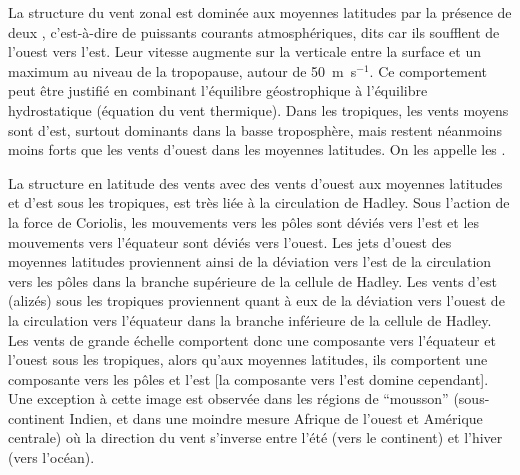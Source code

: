 \sk
La structure du vent zonal est dominée aux moyennes latitudes par la présence de deux , c'est-à-dire de puissants courants atmosphériques, dits  car ils soufflent de l'ouest vers l'est. Leur vitesse augmente sur la verticale entre la surface et un maximum au niveau de la tropopause, autour de 50~m~s$^{-1}$. Ce comportement peut être justifié en combinant l'équilibre géostrophique à l'équilibre hydrostatique (équation du vent thermique). Dans les tropiques, les vents moyens sont d'est, surtout dominants dans la basse troposphère, mais restent néanmoins moins forts que les vents d'ouest dans les moyennes latitudes. On les appelle les .

\sk
La structure en latitude des vents %
avec des vents d'ouest aux moyennes latitudes et d'est sous les tropiques, est très liée à la circulation de Hadley.
Sous l'action de la force de Coriolis, les mouvements vers les pôles sont déviés vers l'est et les mouvements vers l'équateur sont déviés vers l'ouest. Les jets d'ouest des moyennes latitudes proviennent ainsi de la déviation vers l'est de la circulation vers les pôles dans la branche supérieure de la cellule de Hadley. Les vents d'est (alizés) sous les tropiques proviennent quant à eux de la déviation vers l'ouest de la circulation vers l'équateur dans la branche inférieure de la cellule de Hadley. Les vents de grande échelle comportent donc une composante vers l'équateur et l'ouest sous les tropiques, alors qu'aux moyennes latitudes, ils comportent une composante vers les pôles et l'est [la composante vers l'est domine cependant]. Une exception à cette image est observée dans les régions de ``mousson'' (sous-continent Indien, et dans une moindre mesure Afrique de l'ouest et Amérique centrale) où la direction du vent s'inverse entre l'été (vers le continent) et l'hiver (vers l'océan).

